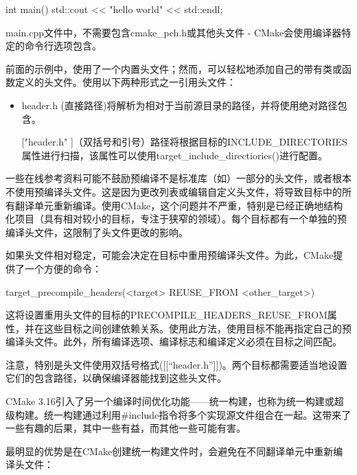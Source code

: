 
\begin{cmake}
int main() {
    std::cout << "hello world" << std::endl;
}
\end{cmake}

main.cpp文件中，不需要包含cmake\_pch.h或其他头文件 - CMake会使用编译器特定的命令行选项包含。

前面的示例中，使用了一个内置头文件；然而，可以轻松地添加自己的带有类或函数定义的头文件。使用以下两种形式之一引用头文件：

\begin{itemize}
\item
header.h (直接路径)将解析为相对于当前源目录的路径，并将使用绝对路径包含。

\item
[["header.h"]]（双括号和引号）路径将根据目标的INCLUDE\_DIRECTORIES属性进行扫描，该属性可以使用target\_include\_directiories()进行配置。
\end{itemize}

一些在线参考资料可能不鼓励预编译不是标准库（如）一部分的头文件，或者根本不使用预编译头文件。这是因为更改列表或编辑自定义头文件，将导致目标中的所有翻译单元重新编译。使用CMake，这个问题并不严重，特别是已经正确地结构化项目（具有相对较小的目标，专注于狭窄的领域）。每个目标都有一个单独的预编译头文件，这限制了头文件更改的影响。

如果头文件相对稳定，可能会决定在目标中重用预编译头文件。为此，CMake提供了一个方便的命令：

\begin{shell}
target_precompile_headers(<target> REUSE_FROM <other_target>)
\end{shell}

这将设置重用头文件的目标的PRECOMPILE\_HEADERS\_REUSE\_FROM属性，并在这些目标之间创建依赖关系。使用此方法，使用目标不能再指定自己的预编译头文件。此外，所有编译选项、编译标志和编译定义必须在目标之间匹配。

注意，特别是头文件使用双括号格式([[“header.h”]])。两个目标都需要适当地设置它们的包含路径，以确保编译器能找到这些头文件。


CMake 3.16引入了另一个编译时间优化功能——统一构建，也称为统一构建或超级构建。统一构建通过利用\#include指令将多个实现源文件组合在一起。这带来了一些有趣的后果，其中一些有益，而其他一些可能有害。

最明显的优势是在CMake创建统一构建文件时，会避免在不同翻译单元中重新编译头文件：


